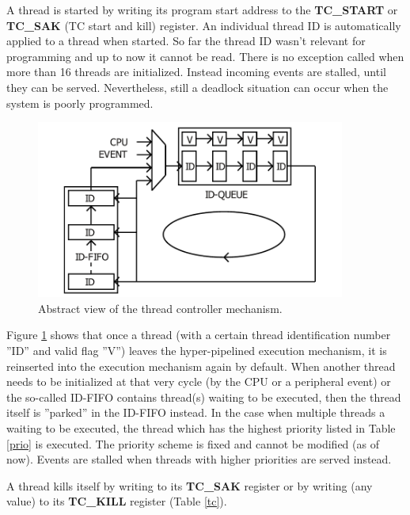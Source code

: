 A thread is started by writing its program start address to the \textbf{TC\_START} or \textbf{TC\_SAK} (TC start and kill) register. An individual thread ID is automatically applied to a thread when started. So far the thread ID wasn't relevant for programming and up to now it cannot be read. There is no exception called when more than 16 threads are initialized. Instead incoming events are stalled, until they can be served. Nevertheless, still a deadlock situation can occur when the system is poorly programmed.

\begin{figure}[!t]
	\centering
	\includegraphics[width=4in]{figs/tc_fifo}
	\caption{Abstract view of the thread controller mechanism.}
	\label{fifo}
\end{figure}


Figure \ref{fifo} shows that once a thread (with a certain thread identification number ''ID'' and valid flag ''V'') leaves the hyper-pipelined execution mechanism, it is reinserted into the execution mechanism again by default. When another thread needs to be initialized at that very cycle (by the CPU or a peripheral event) or the so-called ID-FIFO contains thread(s) waiting to be executed, then the thread itself is ''parked'' in the ID-FIFO instead. In the case when multiple threads a waiting to be executed, the thread which has the highest priority listed in Table \ref{prio} is executed. The priority scheme is fixed and cannot be modified (as of now). Events are stalled when threads with higher priorities are served instead.

A thread kills itself by writing to its \textbf{TC\_SAK} register or by writing (any value) to its \textbf{TC\_KILL}  register (Table \ref{tc}).

